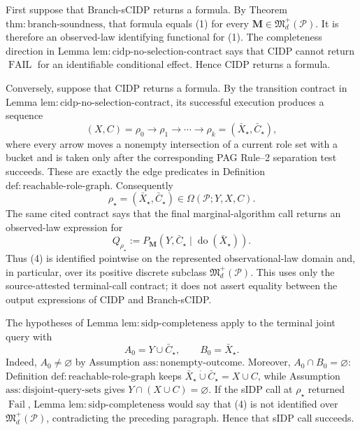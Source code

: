 First suppose that Branch-sCIDP returns a formula.  By Theorem \(\mathrm{thm{:}branch\text{-}soundness}\), that formula equals (1) for every \(\mathbf M\in\mathfrak M_d^+(\mathcal P)\).  It is therefore an observed-law identifying functional for (1).  The completeness direction in Lemma \(\mathrm{lem{:}cidp\text{-}no\text{-}selection\text{-}contract}\) says that CIDP cannot return \(\operatorname{FAIL}\) for an identifiable conditional effect.  Hence CIDP returns a formula.

Conversely, suppose that CIDP returns a formula.  By the transition contract in Lemma \(\mathrm{lem{:}cidp\text{-}no\text{-}selection\text{-}contract}\), its successful execution produces a sequence
\[
 (X,C)=\rho_0\longrightarrow\rho_1\longrightarrow\cdots
 \longrightarrow\rho_k=(\bar X_\star,\bar C_\star),
 \tag{2}
\]
where every arrow moves a nonempty intersection of a current role set with a bucket and is taken only after the corresponding PAG Rule--2 separation test succeeds.  These are exactly the edge predicates in Definition \(\mathrm{def{:}reachable\text{-}role\text{-}graph}\).  Consequently
\[
 \rho_\star=(\bar X_\star,\bar C_\star)
 \in\Omega(\mathcal P;Y,X,C).
 \tag{3}
\]
The same cited contract says that the final marginal-algorithm call returns an observed-law expression for
\[
 Q_{\rho_\star}
 :=P_{\mathbf M}(Y,\bar C_\star
       \mid\operatorname{do}(\bar X_\star)).
 \tag{4}
\]
Thus (4) is identified pointwise on the represented observational-law domain and, in particular, over its positive discrete subclass \(\mathfrak M_d^+(\mathcal P)\).  This uses only the source-attested terminal-call contract; it does not assert equality between the output expressions of CIDP and Branch-sCIDP.

The hypotheses of Lemma \(\mathrm{lem{:}sidp\text{-}completeness}\) apply to the terminal joint query with
\[
 A_0=Y\cup\bar C_\star,
 \qquad B_0=\bar X_\star.
\]
Indeed, \(A_0\neq\varnothing\) by Assumption \(\mathrm{ass{:}nonempty\text{-}outcome}\).  Moreover, \(A_0\cap B_0=\varnothing\): Definition \(\mathrm{def{:}reachable\text{-}role\text{-}graph}\) keeps \(\bar X_\star\mathbin{\dot\cup}\bar C_\star=X\cup C\), while Assumption \(\mathrm{ass{:}disjoint\text{-}query\text{-}sets}\) gives \(Y\cap(X\cup C)=\varnothing\).  If the sIDP call at \(\rho_\star\) returned \(\operatorname{Fail}\), Lemma \(\mathrm{lem{:}sidp\text{-}completeness}\) would say that (4) is not identified over \(\mathfrak M_d^+(\mathcal P)\), contradicting the preceding paragraph.  Hence that sIDP call succeeds.

